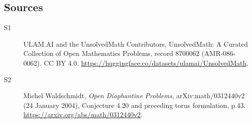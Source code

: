 \documentclass[11pt]{article}
\begin{document}
\subsection{Sources}
\begin{description}
\item[\hypertarget{source:8700062:1}{S1}] ULAM.AI and the UnsolvedMath Contributors, UnsolvedMath: A Curated Collection of Open Mathematics Problems, record 8700062 (AMR-086-0062). CC BY 4.0. \url{https://huggingface.co/datasets/ulamai/UnsolvedMath}.
\item[\hypertarget{source:8700062:2}{S2}] Michel Waldschmidt, \emph{Open Diophantine Problems}, arXiv:math/0312440v2 (24 January 2004), Conjecture 4.20 and preceding torus formulation, p.43. \url{https://arxiv.org/abs/math/0312440v2}.
\end{description}
\label{end:8700062}
\end{document}
